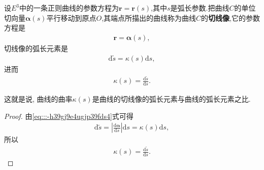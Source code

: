 \documentclass[../../main.tex]{subfiles}%
\begin{document}
\begin{theorem}
设$E^3$中的一条正则曲线的参数方程为$\bm{r}=\bm{r}(s)$,其中$s$是弧长参数.把曲线$C$的单位切向量$\bm{\alpha}(s)$平行移动到原点$O$,其端点所描出的曲线称为曲线$C$的\textbf{切线像},它的参数方程是
\begin{align}
\bm{r} = \bm{\alpha}(s),
\label{eq:::-h39gj9e4ugjp39fds4}
\end{align}
切线像的弧长元素是
\begin{align*}
\mathrm{d}\tilde{s} = \kappa(s)\mathrm{d}s,
\end{align*}
进而
\begin{align*}
\kappa(s) = \frac{\mathrm{d}\tilde{s}}{\mathrm{d}s}.
\end{align*}
\end{theorem}
\begin{remark}
这就是说, 曲线的曲率$\kappa(s)$是曲线的切线像的弧长元素与曲线的弧长元素之比.
\end{remark}
\begin{proof}

由\eqref{eq:::-h39gj9e4ugjp39fds4}式可得
\begin{align*}
\mathrm{d}\tilde{s} = \left| \frac{\mathrm{d}\bm{\alpha}}{\mathrm{d}s} \right| \mathrm{d}s = \kappa(s)\mathrm{d}s,
\end{align*}
所以
\begin{align*}
\kappa(s) = \frac{\mathrm{d}\tilde{s}}{\mathrm{d}s}.
\end{align*}

\end{proof}
\end{document}
